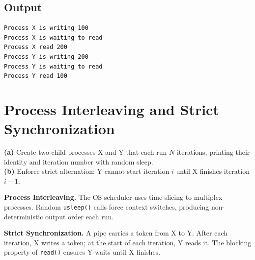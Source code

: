 \documentclass[11pt,a4paper]{article}
\begin{document}
\subsection*{Output}
\begin{outputbox}
\begin{lstlisting}[style=outputstyle]
Process X is writing 100
Process X is waiting to read
Process X read 200
Process Y is writing 200
Process Y is waiting to read
Process Y read 100
\end{lstlisting}
\end{outputbox}

\newpage

\section{Process Interleaving and Strict Synchronization}

\begin{questionbox}
\textbf{(a)} Create two child processes X and Y that each run $N$ iterations, printing their identity and iteration number with random sleep.\\
\textbf{(b)} Enforce strict alternation: Y cannot start iteration $i$ until X finishes iteration $i-1$.
\end{questionbox}

\begin{theorybox}
\textbf{Process Interleaving.} The OS scheduler uses time-slicing to multiplex processes. Random \texttt{usleep()} calls force context switches, producing non-deterministic output order each run.

\textbf{Strict Synchronization.} A pipe carries a token from X to Y. After each iteration, X writes a token; at the start of each iteration, Y reads it. The blocking property of \texttt{read()} ensures Y waits until X finishes.
\end{theorybox}
\end{document}

